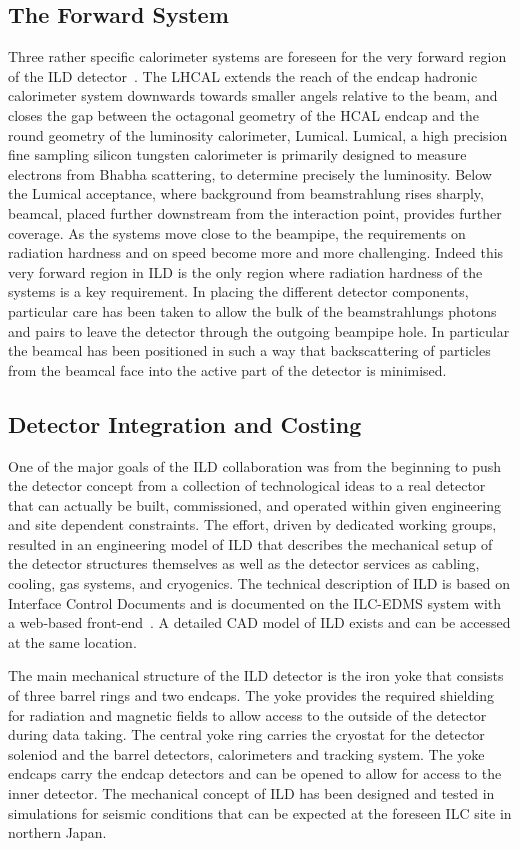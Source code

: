 \documentclass[%
 amsmath,amssymb,
 aps,
]{revtex4-1}
\begin{document}
\subsection{The Forward System}
Three rather specific calorimeter systems are foreseen for the very forward region of the ILD detector~\cite{Abramowicz:2010bg}. The LHCAL extends the reach of the endcap hadronic calorimeter system downwards towards smaller angels relative to the beam, and closes the gap between the octagonal geometry of the HCAL endcap and the round geometry of the luminosity calorimeter, Lumical. Lumical, a high precision fine sampling silicon tungsten calorimeter is primarily designed to measure electrons from Bhabha scattering, to determine precisely the luminosity. Below the Lumical acceptance, where background from beamstrahlung rises sharply, beamcal, placed further downstream from the interaction point, provides further coverage. As the systems move close to the beampipe, the requirements on radiation hardness and on speed become more and more challenging. Indeed this very forward region in ILD is the only region where radiation hardness of the systems is a key requirement. In placing the different detector components, particular care has been taken to allow the bulk of the beamstrahlungs photons and pairs to leave the detector through the outgoing beampipe hole. In particular the beamcal has been positioned in such a way that backscattering of particles from the beamcal face into the active part of the detector is minimised.

\subsection{Detector Integration and Costing}
One of the major goals of the ILD collaboration was from the beginning to push the detector concept from a collection of technological ideas to a real detector that can actually be built, commissioned, and operated within given engineering and site dependent constraints. The effort, driven by dedicated working groups, resulted in an engineering model of ILD that describes the mechanical setup of the detector structures themselves as well as the detector services as cabling, cooling, gas systems, and cryogenics. The technical description of ILD is based on Interface Control Documents and is documented on the ILC-EDMS system with a web-based front-end~\cite{EDMS}. A detailed CAD model of ILD exists and can be accessed at the same location.

The main mechanical structure of the ILD detector is the iron yoke that consists of three barrel rings and two endcaps. The yoke provides the required shielding for radiation and magnetic fields to allow access to the outside of the detector during data taking. The central yoke ring carries the cryostat for the detector soleniod and the barrel detectors, calorimeters and tracking system. The yoke endcaps carry the endcap detectors and can be opened to allow for access to the inner detector. The mechanical concept of ILD has been designed and tested in simulations for seismic conditions that can be expected at the foreseen ILC site in northern Japan.
\end{document}
